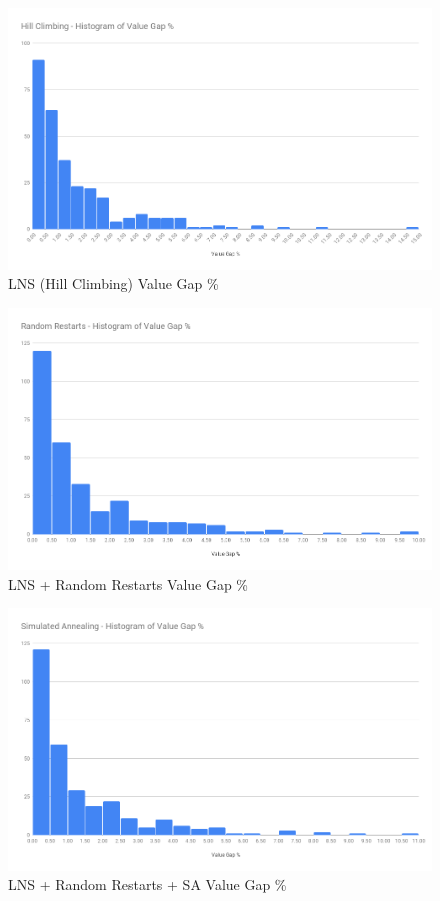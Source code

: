\begin{figure}[!htbp]
    \centering
    \includegraphics[width=\textwidth]{Figures/Metaheuristics/hill_climb_value_gap.png}
    \caption{LNS (Hill Climbing) Value Gap \%}
    \label{fig:value_gap_perc_hill_climb}
\end{figure}

\begin{figure}[!htbp]
    \centering
    \includegraphics[width=\textwidth]{Figures/Metaheuristics/restarts_value_gap.png}
    \caption{LNS + Random Restarts Value Gap \%}
    \label{fig:value_gap_perc_restarts}
\end{figure}

\begin{figure}[!htbp]
    \centering
    \includegraphics[width=\textwidth]{Figures/Metaheuristics/annealing_value_gap.png}
    \caption{LNS + Random Restarts + SA Value Gap \%}
    \label{fig:value_gap_perc_annealing}
\end{figure}

